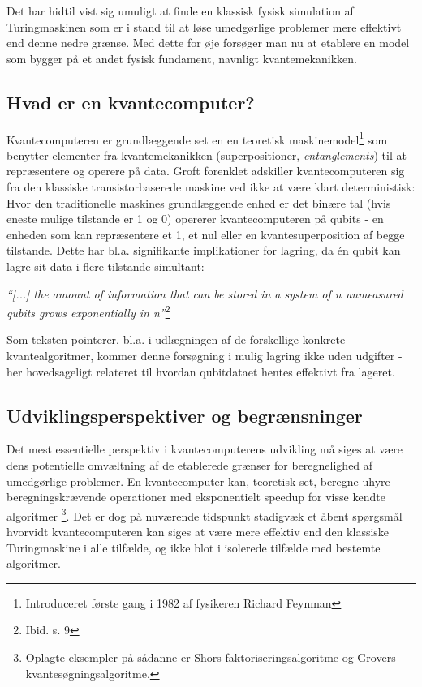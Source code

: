 \documentclass[10pt,a4paper]{article}
\newcommand{\citat}[2]{\begin{justify}\textit{``#1''}\hspace{0.1cm}\footnote{#2}\end{justify}}
\begin{document}
Det har hidtil vist sig umuligt at finde en klassisk fysisk simulation 
af Turingmaskinen som er i stand til at løse umedgørlige problemer
mere effektivt end denne nedre grænse. Med dette for øje forsøger man 
nu at etablere en model som bygger på et andet fysisk fundament, navnligt
kvantemekanikken. 

\subsection{Hvad er en kvantecomputer?}
Kvantecomputeren er grundlæggende set en en teoretisk maskinemodel\footnote{
Introduceret første gang i 1982 af fysikeren Richard Feynman} som benytter 
elementer fra kvantemekanikken (superpositioner, \textit{entanglements}) til 
at repræsentere og operere på data. Groft forenklet adskiller kvantecomputeren
sig fra den klassiske transistorbaserede maskine ved ikke at være klart
deterministisk: Hvor den traditionelle maskines grundlæggende enhed er det binære 
tal (hvis eneste mulige tilstande er 1 og 0) opererer kvantecomputeren på qubits
- en enheden som kan repræsentere et 1, et nul eller en kvantesuperposition af 
begge tilstande. Dette har bl.a. signifikante implikationer for lagring, da én qubit 
kan lagre sit data i flere tilstande simultant: 
\citat{[...] the amount of information that can be stored in a system of  
\textit{n} unmeasured qubits grows exponentially in \textit{n}}{Ibid. s. 9}

Som teksten 
pointerer, bl.a. i udlægningen af de forskellige konkrete kvantealgoritmer, 
kommer denne forsøgning i mulig lagring ikke uden udgifter - her hovedsageligt 
relateret til hvordan qubitdataet hentes effektivt fra lageret. 

\subsection{Udviklingsperspektiver og begrænsninger}
Det mest essentielle perspektiv i kvantecomputerens udvikling må siges at være 
dens potentielle omvæltning af de etablerede grænser for beregnelighed af 
umedgørlige problemer. En kvantecomputer kan, teoretisk set, beregne uhyre 
beregningskrævende operationer med eksponentielt speedup for visse kendte algoritmer \footnote{Oplagte eksempler på sådanne er Shors faktoriseringsalgoritme og
Grovers kvantesøgningsalgoritme.}. Det er dog på nuværende tidspunkt stadigvæk 
et åbent spørgsmål hvorvidt kvantecomputeren kan siges at være mere effektiv
end den klassiske Turingmaskine i alle tilfælde, og ikke blot i isolerede tilfælde
med bestemte algoritmer. 
\end{document}

